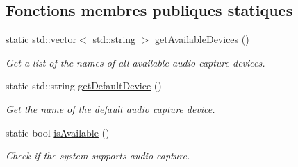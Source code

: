 \subsection*{Fonctions membres publiques statiques}
\begin{DoxyCompactItemize}
\item 
static std\+::vector$<$ std\+::string $>$ \hyperlink{classsf_1_1SoundRecorder_a26198c5c11efcd61f426f326fe314afe}{get\+Available\+Devices} ()
\begin{DoxyCompactList}\small\item\em Get a list of the names of all available audio capture devices. \end{DoxyCompactList}\item 
static std\+::string \hyperlink{classsf_1_1SoundRecorder_ad1d450a80642dab4b632999d72a1bf23}{get\+Default\+Device} ()
\begin{DoxyCompactList}\small\item\em Get the name of the default audio capture device. \end{DoxyCompactList}\item 
static bool \hyperlink{classsf_1_1SoundRecorder_aab2bd0fee9e48d6cfd449b1cb078ce5a}{is\+Available} ()
\begin{DoxyCompactList}\small\item\em Check if the system supports audio capture. \end{DoxyCompactList}\end{DoxyCompactItemize}
